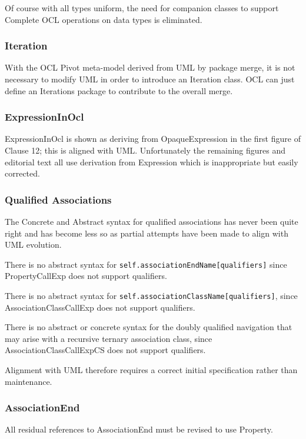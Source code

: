 \documentclass{eceasst}
\begin{document}
Of course with all types uniform, the need for companion classes to support Complete OCL operations on data types is eliminated.

\subsubsection{Iteration}

With the OCL Pivot meta-model derived from UML by package merge, it is not necessary to modify UML in order to introduce an Iteration class. OCL can just define an Iterations package to contribute to the overall merge.

\subsubsection{ExpressionInOcl}

ExpressionInOcl is shown as deriving from OpaqueExpression in the first figure of Clause 12; this is aligned with UML. Unfortunately the remaining figures and editorial text all use derivation from Expression which is inappropriate but easily corrected.

\subsubsection{Qualified Associations}

The Concrete and Abstract syntax for qualified associations has never been quite right and has become less so as partial attempts have been made to align with UML evolution.

There is no abstract syntax for \verb|self.associationEndName[qualifiers]| since PropertyCallExp does not support qualifiers.

There is no abstract syntax for \verb|self.associationClassName[qualifiers]|, since AssociationClassCallExp does not support qualifiers.

There is no abstract or concrete syntax for the doubly qualified navigation that may arise with a recursive ternary association class, since AssociationClassCallExpCS does not support qualifiers.

Alignment with UML therefore requires a correct initial specification rather than maintenance. 

\subsubsection{AssociationEnd}

All residual references to AssociationEnd must be revised to use Property.
\end{document}
